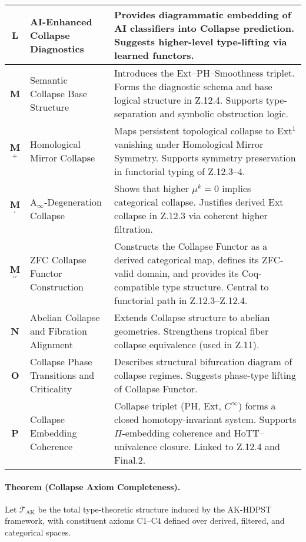 \documentclass[11pt]{article}
\begin{document}
\begin{axiom}
\begin{axiom}
{{\begin{longtable}{|c|p{5.2cm}|p{7.5cm}|}
\hline
\textbf{L} & AI-Enhanced Collapse Diagnostics & Provides diagrammatic embedding of AI classifiers into Collapse prediction. Suggests higher-level type-lifting via learned functors. \\
\hline
\textbf{M} & Semantic Collapse Base Structure & Introduces the Ext–PH–Smoothness triplet. Forms the diagnostic schema and base logical structure in Z.12.4. Supports type-separation and symbolic obstruction logic. \\
\hline
\textbf{M$^+$} & Homological Mirror Collapse & Maps persistent topological collapse to Ext$^1$ vanishing under Homological Mirror Symmetry. Supports symmetry preservation in functorial typing of Z.12.3–4. \\
\hline
\textbf{M$^\prime$} & A$_\infty$-Degeneration Collapse & Shows that higher \(\mu^k = 0\) implies categorical collapse. Justifies derived Ext collapse in Z.12.3 via coherent higher filtration. \\
\hline
\textbf{M$^{\prime\prime}$} & ZFC Collapse Functor Construction & Constructs the Collapse Functor as a derived categorical map, defines its ZFC-valid domain, and provides its Coq-compatible type structure. Central to functorial path in Z.12.3–Z.12.4. \\
\hline
\textbf{N} & Abelian Collapse and Fibration Alignment & Extends Collapse structure to abelian geometries. Strengthens tropical fiber collapse equivalence (used in Z.11). \\
\hline
\textbf{O} & Collapse Phase Transitions and Criticality & Describes structural bifurcation diagram of collapse regimes. Suggests phase-type lifting of Collapse Functor. \\
\hline
\textbf{P} & Collapse Embedding Coherence & Collapse triplet (PH, Ext, \(C^\infty\)) forms a closed homotopy-invariant system. Supports \(\Pi\)-embedding coherence and HoTT–univalence closure. Linked to Z.12.4 and Final.2. \\
\hline
\end{longtable}



\paragraph{Theorem (Collapse Axiom Completeness).}

Let \( \mathcal{T}_{\text{AK}} \) be the total type-theoretic structure induced by the AK-HDPST framework,  
with constituent axioms C1–C4 defined over derived, filtered, and categorical spaces.

}}
\end{axiom}
\end{axiom}
\end{document}
